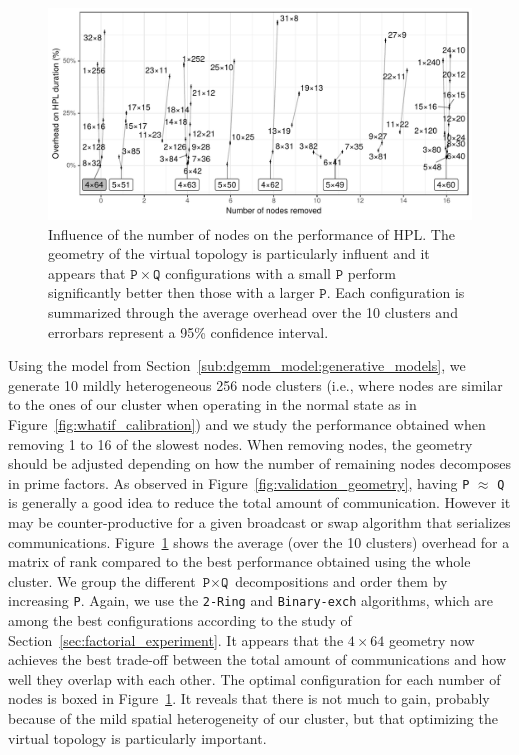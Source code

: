         \begin{figure}[htpb]
            \centering
            \includegraphics[width=\linewidth]{img/prediction/sensibility/spatial/whatif_removing_nodes.pdf}
            \caption{Influence of the number of nodes on the performance of HPL\@. The geometry of the virtual topology
                is particularly influent and it appears that $\mathtt{P}\times\mathtt{Q}$ configurations with a small
                $\mathtt{P}$ perform significantly better then those with a larger $\mathtt{P}$. Each configuration is
                summarized through the average overhead over the 10 clusters and errorbars represent a 95\% confidence
            interval.}
            \label{fig:whatif_removing_nodes}
        \end{figure}

        Using the model from Section~\ref{sub:dgemm_model:generative_models}, we generate 10 mildly heterogeneous 256
        node clusters (i.e., where nodes are similar to the ones of our cluster when operating in the normal state as in
        Figure~\ref{fig:whatif_calibration}) and we study the performance obtained when removing 1 to 16 of the slowest
        nodes. When removing nodes, the geometry should be adjusted depending on how the number of remaining nodes
        decomposes in prime factors. As observed in Figure~\ref{fig:validation_geometry}, having \texttt{P} \(\approx\)
        \texttt{Q} is generally a good idea to reduce the total amount of communication. However it may be
        counter-productive for a given broadcast or swap algorithm that serializes communications.
        Figure~\ref{fig:whatif_removing_nodes} shows the average (over the 10 clusters) overhead for a matrix of rank
         compared to the best performance obtained using the whole cluster. We group the different
        \(\texttt{P}\times\texttt{Q}\) decompositions and order them by increasing \texttt{P}. Again, we use the
        \texttt{2-Ring} and \texttt{Binary-exch} algorithms, which are among the best configurations according to the
        study of Section~\ref{sec:factorial_experiment}. It appears that the \(4\times64\) geometry now achieves the
        best trade-off between the total amount of communications and how well they overlap with each other. The optimal
        configuration for each number of nodes is boxed in Figure~\ref{fig:whatif_removing_nodes}. It reveals that there
        is not much to gain, probably because of the mild spatial heterogeneity of our cluster, but that optimizing the
        virtual topology is particularly important.

